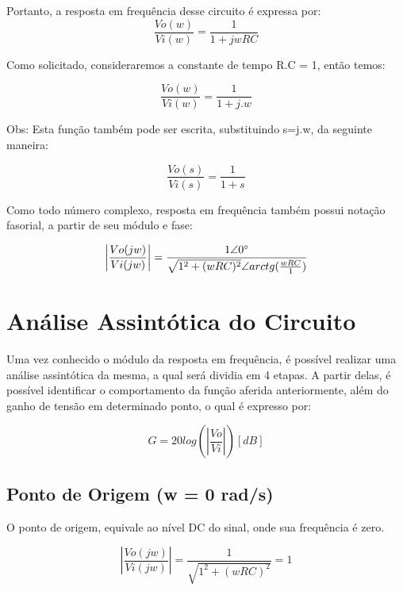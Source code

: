 \documentclass[12pt]{article}
\begin{document}
Portanto, a resposta em frequência desse circuito é expressa por:
\begin{equation}
\frac{Vo(w)}{Vi(w)}=\frac{1}{1+jwRC}
\end{equation}

Como solicitado, consideraremos a constante de tempo R.C = 1, então temos:

\begin{equation}
\frac{Vo(w)}{Vi(w)}=\frac{1}{1+j.w}
\end{equation}

Obs: Esta função também pode ser escrita, substituindo s=j.w, da seguinte maneira:
 
\begin{equation}
\frac{Vo(s)}{Vi(s)}=\frac{1}{1+\textit{s}}
\end{equation}


Como todo número complexo, resposta em frequência também possui notação fasorial, a partir de seu módulo e fase:

\begin{equation}
\left|\frac{Vo(jw)}{Vi(jw)} \right|= \frac{1\angle 0\degree}{\sqrt{1^2+(wRC)^2}\angle arctg(\frac{wRC}{1})} 
\end{equation}


 \section{Análise Assintótica do Circuito}     
Uma vez conhecido o módulo da resposta em frequência, é possível realizar uma análise assintótica da mesma, a qual será dividia em 4 etapas. A partir delas, é possível identificar o comportamento da função aferida anteriormente, além do ganho de tensão em determinado ponto, o qual é expresso por:

\begin{equation}
G = 20log(\left|\frac{Vo}{Vi} \right|) [dB]
\end{equation}


\subsection{Ponto de Origem (w = 0 rad/s)}

O ponto de origem, equivale ao nível DC do sinal, onde sua frequência é zero.

\begin{equation}
\left|\frac{Vo(jw)}{Vi(jw)} \right| = \frac{1}{\sqrt{1^2+(wRC)^2}} = 1
\end{equation}
\end{document}
